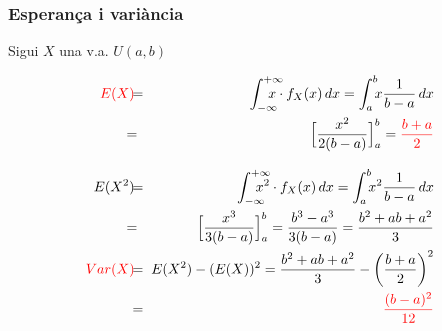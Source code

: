 \documentclass[12pt,t]{beamer}\usepackage[]{graphicx}\usepackage[]{color}
\newcommand{\red}[1]{\textcolor{red}{#1}}
\theoremstyle{plain}
\theoremstyle{definition}
\begin{document}
\begin{frame}
\frametitle{Esperança i variància}
\vspace*{-2ex}

Sigui $X$ una v.a. $U(a,b)$
\vspace*{-3ex}

\begin{eqnarray*}
\red{E(X)} &\hspace*{-1ex}= & \hspace*{-2ex}\int_{-\infty}^{+\infty} \hspace*{-3ex}x \cdot f_X(x)\, dx=\int_{a}^{b} \hspace*{-1ex}x \frac{1}{b-a}\, dx \\ &\hspace*{-2ex}= & \hspace*{-2ex}
\Big[\frac{x^2}{2(b-a)}\Big]_{a}^{b}=\red{\frac{b+a}{2}} \\[2ex] 
E(X^2)& \hspace*{-1ex}=  & \hspace*{-2ex} \int_{-\infty}^{+\infty} \hspace*{-3ex} x^2\cdot f_X(x)\, dx=\int_{a}^{b}  \hspace*{-1ex}x^2 \frac{1}{b-a}\, dx \\ &\hspace*{-2ex}= & \hspace*{-2ex}\Big[\frac{x^3}{3(b-a)}\Big]_{a}^{b} =\frac{b^3-a^3}{3(b-a)} = \frac{b^2+ab+a^2}{3} \\ 
\red{Var(X)} & \hspace*{-1ex}= & \hspace*{-1ex} E(X^2)-(E(X))^2=\frac{b^2+ab+a^2}{3}-\left(\frac{b+a}{2}\right)^2\\ & \hspace*{-1ex}= & \hspace*{-1ex} \red{\frac{(b-a)^2}{12}}
\end{eqnarray*}
\end{frame}
\end{document}
